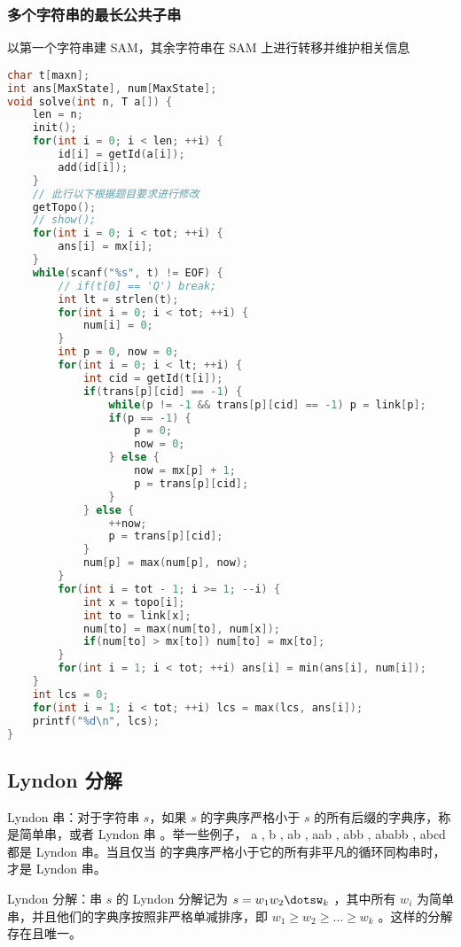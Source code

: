 \subsubsection{多个字符串的最长公共子串}

以第一个字符串建 SAM，其余字符串在 SAM 上进行转移并维护相关信息

\begin{lstlisting}[language=C++]
char t[maxn];
int ans[MaxState], num[MaxState];
void solve(int n, T a[]) {
    len = n;
    init();
    for(int i = 0; i < len; ++i) {
        id[i] = getId(a[i]);
        add(id[i]);
    }
    // 此行以下根据题目要求进行修改
    getTopo();
    // show();
    for(int i = 0; i < tot; ++i) {
        ans[i] = mx[i];
    }
    while(scanf("%s", t) != EOF) {
        // if(t[0] == 'Q') break;
        int lt = strlen(t);
        for(int i = 0; i < tot; ++i) {
            num[i] = 0;
        }
        int p = 0, now = 0;
        for(int i = 0; i < lt; ++i) {
            int cid = getId(t[i]);
            if(trans[p][cid] == -1) {
                while(p != -1 && trans[p][cid] == -1) p = link[p];
                if(p == -1) {
                    p = 0;
                    now = 0;
                } else {
                    now = mx[p] + 1;
                    p = trans[p][cid];
                }
            } else {
                ++now;
                p = trans[p][cid];
            }
            num[p] = max(num[p], now);
        }
        for(int i = tot - 1; i >= 1; --i) {
            int x = topo[i];
            int to = link[x];
            num[to] = max(num[to], num[x]);
            if(num[to] > mx[to]) num[to] = mx[to];
        }
        for(int i = 1; i < tot; ++i) ans[i] = min(ans[i], num[i]);
    }
    int lcs = 0;
    for(int i = 1; i < tot; ++i) lcs = max(lcs, ans[i]);
    printf("%d\n", lcs);
}    
\end{lstlisting}

\subsection{Lyndon 分解}

Lyndon 串：对于字符串 $s$，如果 $s$ 的字典序严格小于 $s$ 的所有后缀的字典序，称  是简单串，或者 Lyndon 串 。举一些例子， a , b , ab , aab , abb , ababb , abcd 都是 Lyndon 串。当且仅当  的字典序严格小于它的所有非平凡的循环同构串时，  才是 Lyndon 串。

Lyndon 分解：串 $s$ 的 Lyndon 分解记为 $s = w_1w_2\dotsw_k$ ，其中所有 $w_i$ 为简单串，并且他们的字典序按照非严格单减排序，即 $w_1 \ge w_2 \ge \dots \ge w_k$ 。这样的分解存在且唯一。

